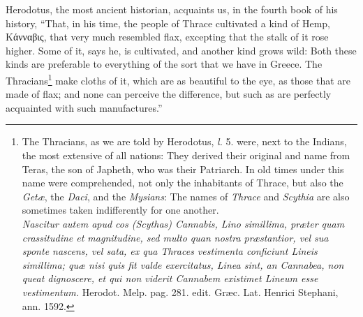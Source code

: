 \documentclass[a4paper, 11pt, oneside, polutonikogreek, english]{article}
\begin{document}
Herodotus, the most ancient historian, acquaints us, in the fourth book of his history, ``That, in his time, the people of Thrace cultivated a kind of Hemp, Κάνναβις, that very much resembled flax, excepting that the stalk of it rose higher. Some of it, says he, is cultivated, and another kind grows wild: Both these kinds are preferable to everything of the sort that we have in Greece. The Thracians\footnote{The Thracians, as we are told by Herodotus, \emph{l.} 5. were, next to the Indians, the most extensive of all nations: They derived their original and name from Teras, the son of Japheth, who was their Patriarch. In old times under this name were comprehended, not only the inhabitants of Thrace, but also the \emph{Getæ}, the \emph{Daci}, and the \emph{Mysians}: The names of \emph{Thrace} and \emph{Scythia} are also sometimes taken indifferently for one another.\\\hspace*{5mm}\emph{Nascitur autem apud cos (Scythas) Cannabis, Lino simillima, præter quam crassitudine et magnitudine, sed multo quan nostra præstantior, vel sua sponte nascens, vel sata, ex qua Thraces vestimenta conficiunt Lineis simillima; quæ nisi quis fit valde exercitatus, Linea sint, an Cannabea, non queat dignoscere, et qui non viderit Cannabem existimet Lineum esse vestimentum.} Herodot. Melp. pag. 281. edit. Græc. Lat. Henrici Stephani, ann. 1592.} make cloths of it, which are as beautiful to the eye, as those that are made of flax; and none can perceive the difference, but such as are perfectly acquainted with such manufactures.''
\end{document}
